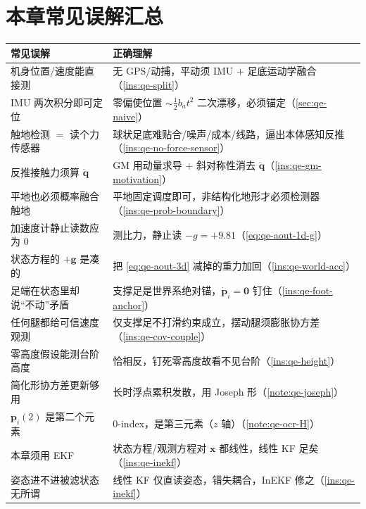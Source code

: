 \section*{本章常见误解汇总}
\begin{table}[H]\centering\small
\begin{tabular}{p{} p{}}
\toprule
\textbf{常见误解} & \textbf{正确理解} \\
\midrule
机身位置/速度能直接测 & 无 GPS/动捕，平动须 IMU $+$ 足底运动学融合（\cref{ins:qe-split}）\\
IMU 两次积分即可定位 & 零偏使位置 $\sim\tfrac12 b_a t^2$ 二次漂移，必须锚定（\cref{sec:qe-naive}）\\
触地检测 $=$ 读个力传感器 & 球状足底难贴合/噪声/成本/线路，逼出本体感知反推（\cref{ins:qe-no-force-sensor}）\\
反推接触力须算 $\ddot{\boldsymbol q}$ & GM 用动量求导 $+$ 斜对称性消去 $\ddot{\boldsymbol q}$（\cref{ins:qe-gm-motivation}）\\
平地也必须概率融合触地 & 平地固定调度即可，非结构化地形才必须检测器（\cref{ins:qe-prob-boundary}）\\
加速度计静止读数应为 $0$ & 测比力，静止读 $-g=+9.81$（\cref{eq:qe-aout-1d-g}）\\
状态方程的 $+\boldsymbol g$ 是凑的 & 把 \cref{eq:qe-aout-3d} 减掉的重力加回（\cref{ins:qe-world-acc}）\\
足端在状态里却说“不动”矛盾 & 支撑足是世界系绝对锚，$\dot{\boldsymbol p}_i=\boldsymbol 0$ 钉住（\cref{ins:qe-foot-anchor}）\\
任何腿都给可信速度观测 & 仅支撑足不打滑约束成立，摆动腿须膨胀协方差（\cref{ins:qe-cov-couple}）\\
零高度假设能测台阶高度 & 恰相反，钉死零高度故看不见台阶（\cref{ins:qe-height}）\\
简化形协方差更新够用 & 长时浮点累积发散，用 Joseph 形（\cref{note:qe-joseph}）\\
$\boldsymbol p_i(2)$ 是第二个元素 & $0$-index，是第三元素（$z$ 轴）（\cref{note:qe-ocr-H}）\\
本章须用 EKF & 状态方程/观测方程对 $\boldsymbol x$ 都线性，线性 KF 足矣（\cref{ins:qe-inekf}）\\
姿态进不进被滤状态无所谓 & 线性 KF 仅直读姿态，错失耦合，InEKF 修之（\cref{ins:qe-inekf}）\\
\bottomrule
\end{tabular}
\end{table}

